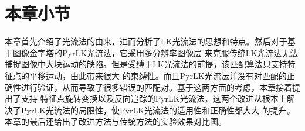\section{本章小节}
\label{sec:conclusion}
本章首先介绍了光流法的由来，进而分析了LK光流法的思想和特点。然后对于基于图像金字塔的PyrLK光流法，它采用多分辨率图像层
来克服传统LK光流法无法捕捉图像中大块运动的缺陷。但是受缚于LK光流法的前提，该匹配算法只支持特征点的平移运动，由此带来很大
的束缚性。而且PyrLK光流法并没有对匹配的正确性进行验证，从而导致了很多错误的匹配对。基于这两方面的考虑，本章接着提出了支持
特征点旋转变换以及反向追踪的PyrLK光流法，这两个改进从根本上解决了PyrLK光流法的局限性，使PyrLK光流法的适用性和正确性都大大
的提升。本章的最后还给出了改进方法与传统方法的实验效果对比图。
